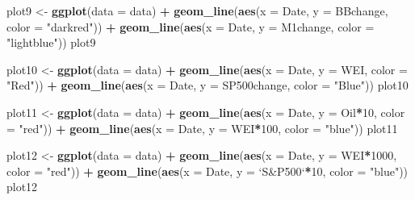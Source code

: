 \documentclass[]{article}
\newenvironment{Shaded}{\begin{snugshade}}{\end{snugshade}}
\newcommand{\KeywordTok}[1]{\textcolor[rgb]{0.13,0.29,0.53}{\textbf{#1}}}
\newcommand{\DataTypeTok}[1]{\textcolor[rgb]{0.13,0.29,0.53}{#1}}
\newcommand{\DecValTok}[1]{\textcolor[rgb]{0.00,0.00,0.81}{#1}}
\newcommand{\StringTok}[1]{\textcolor[rgb]{0.31,0.60,0.02}{#1}}
\newcommand{\OperatorTok}[1]{\textcolor[rgb]{0.81,0.36,0.00}{\textbf{#1}}}
\newcommand{\NormalTok}[1]{#1}
\begin{document}
\begin{Shaded}
\begin{Highlighting}[]
\NormalTok{plot9 <-}\StringTok{ }\KeywordTok{ggplot}\NormalTok{(}\DataTypeTok{data =}\NormalTok{ data) }\OperatorTok{+}
\StringTok{  }\KeywordTok{geom_line}\NormalTok{(}\KeywordTok{aes}\NormalTok{(}\DataTypeTok{x =}\NormalTok{ Date, }\DataTypeTok{y =}\NormalTok{ BBchange, }\DataTypeTok{color =} \StringTok{"darkred"}\NormalTok{)) }\OperatorTok{+}\StringTok{ }
\StringTok{  }\KeywordTok{geom_line}\NormalTok{(}\KeywordTok{aes}\NormalTok{(}\DataTypeTok{x =}\NormalTok{ Date, }\DataTypeTok{y =}\NormalTok{ M1change, }\DataTypeTok{color =} \StringTok{"lightblue"}\NormalTok{))}
\NormalTok{plot9}

\NormalTok{plot10 <-}\StringTok{ }\KeywordTok{ggplot}\NormalTok{(}\DataTypeTok{data =}\NormalTok{ data) }\OperatorTok{+}
\StringTok{  }\KeywordTok{geom_line}\NormalTok{(}\KeywordTok{aes}\NormalTok{(}\DataTypeTok{x =}\NormalTok{ Date, }\DataTypeTok{y =}\NormalTok{ WEI, }\DataTypeTok{color =} \StringTok{"Red"}\NormalTok{)) }\OperatorTok{+}\StringTok{ }
\StringTok{  }\KeywordTok{geom_line}\NormalTok{(}\KeywordTok{aes}\NormalTok{(}\DataTypeTok{x =}\NormalTok{ Date, }\DataTypeTok{y =}\NormalTok{ SP500change, }\DataTypeTok{color =} \StringTok{"Blue"}\NormalTok{))}
\NormalTok{plot10}

\NormalTok{plot11 <-}\StringTok{ }\KeywordTok{ggplot}\NormalTok{(}\DataTypeTok{data =}\NormalTok{ data) }\OperatorTok{+}\StringTok{ }
\StringTok{  }\KeywordTok{geom_line}\NormalTok{(}\KeywordTok{aes}\NormalTok{(}\DataTypeTok{x =}\NormalTok{ Date, }\DataTypeTok{y =}\NormalTok{ Oil}\OperatorTok{*}\DecValTok{10}\NormalTok{, }\DataTypeTok{color =} \StringTok{"red"}\NormalTok{)) }\OperatorTok{+}\StringTok{ }
\StringTok{  }\KeywordTok{geom_line}\NormalTok{(}\KeywordTok{aes}\NormalTok{(}\DataTypeTok{x =}\NormalTok{ Date, }\DataTypeTok{y =}\NormalTok{ WEI}\OperatorTok{*}\DecValTok{100}\NormalTok{, }\DataTypeTok{color =} \StringTok{"blue"}\NormalTok{))}
\NormalTok{plot11}

\NormalTok{plot12 <-}\StringTok{ }\KeywordTok{ggplot}\NormalTok{(}\DataTypeTok{data =}\NormalTok{ data) }\OperatorTok{+}
\StringTok{  }\KeywordTok{geom_line}\NormalTok{(}\KeywordTok{aes}\NormalTok{(}\DataTypeTok{x =}\NormalTok{ Date, }\DataTypeTok{y =}\NormalTok{ WEI}\OperatorTok{*}\DecValTok{1000}\NormalTok{, }\DataTypeTok{color =} \StringTok{"red"}\NormalTok{)) }\OperatorTok{+}
\StringTok{  }\KeywordTok{geom_line}\NormalTok{(}\KeywordTok{aes}\NormalTok{(}\DataTypeTok{x =}\NormalTok{ Date, }\DataTypeTok{y =} \StringTok{`}\DataTypeTok{S&P500}\StringTok{`}\OperatorTok{*}\DecValTok{10}\NormalTok{, }\DataTypeTok{color =} \StringTok{"blue"}\NormalTok{))}
\NormalTok{plot12}


\end{Highlighting}
\end{Shaded}
\end{document}

